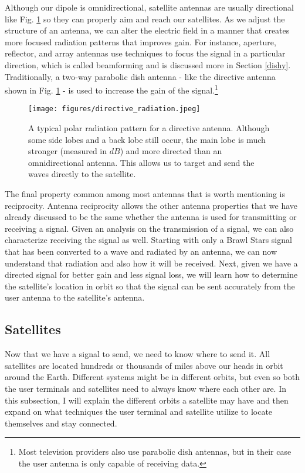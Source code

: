 \documentclass[10pt]{article}
\begin{document}
Although our dipole is omnidirectional, satellite antennas are usually directional like Fig. \ref{fig:radiation_pattern} so they can properly aim and reach our satellites. As we adjust the structure of an antenna, we can alter the electric field in a manner that creates more focused radiation patterns that improves gain. For instance, aperture, reflector, and array antennas use techniques to focus the signal in a particular direction, which is called beamforming and is discussed more in Section \ref{dishy}. Traditionally, a two-way parabolic dish antenna - like the directive antenna shown in Fig. \ref{fig:radiation_pattern} - is used to increase the gain of the signal.\footnote{Most television providers also use parabolic dish antennas, but in their case the user antenna is only capable of receiving data.}

\begin{figure}[h!]
\centering
\texttt{[image: figures/directive\_radiation.jpeg]}
\caption{A typical polar radiation pattern for a directive antenna. Although some side lobes and a back lobe still occur, the main lobe is much stronger (measured in $\si{dB}$) and more directed than an omnidirectional antenna. This allows us to target and send the waves directly to the satellite\cite{direct_radiation}.} 
\label{fig:radiation_pattern}
\end{figure}

The final property common among most antennas that is worth mentioning is reciprocity. Antenna reciprocity allows the other antenna properties that we have already discussed to be the same whether the antenna is used for transmitting or receiving a signal. Given an analysis on the transmission of a signal, we can also characterize receiving the signal as well. Starting with only a Brawl Stars signal that has been converted to a wave and radiated by an antenna, we can now understand that radiation and also how it will be received. Next, given we have a directed signal for better gain and less signal loss, we will learn how to determine the satellite's location in orbit so that the signal can be sent accurately from the user antenna to the satellite's antenna.

\subsection{Satellites}
\label{satellites}

Now that we have a signal to send, we need to know where to send it. All satellites are located hundreds or thousands of miles above our heads in orbit around the Earth. Different systems might be in different orbits, but even so both the user terminals and satellites need to always know where each other are. In this subsection, I will explain the different orbits a satellite may have and then expand on what techniques the user terminal and satellite utilize to locate themselves and stay connected.
\end{document}
